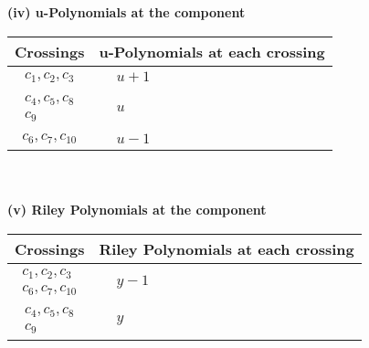 \documentclass[1p]{elsarticle_modified}
\theoremstyle{definition}
\begin{document}
\newpage\renewcommand{\arraystretch}{1}
\flushleft \textbf{(iv) u-Polynomials at the component}\newline \\
\begin{tabular}{m{50pt}|m{274pt}}
Crossings & \hspace{64pt}u-Polynomials at each crossing \\
\hline $$\begin{aligned}c_{1},c_{2},c_{3}\end{aligned}$$&$\begin{aligned}
&u+1
\end{aligned}$\\
\hline $$\begin{aligned}c_{4},c_{5},c_{8}\\c_{9}\end{aligned}$$&$\begin{aligned}
&u
\end{aligned}$\\
\hline $$\begin{aligned}c_{6},c_{7},c_{10}\end{aligned}$$&$\begin{aligned}
&u-1
\end{aligned}$\\
\hline
\end{tabular}\\~\\
\newpage\renewcommand{\arraystretch}{1}
\flushleft \textbf{(v) Riley Polynomials at the component}\newline \\
\begin{tabular}{m{50pt}|m{274pt}}
Crossings & \hspace{64pt}Riley Polynomials at each crossing \\
\hline $$\begin{aligned}c_{1},c_{2},c_{3}\\c_{6},c_{7},c_{10}\end{aligned}$$&$\begin{aligned}
&y-1
\end{aligned}$\\
\hline $$\begin{aligned}c_{4},c_{5},c_{8}\\c_{9}\end{aligned}$$&$\begin{aligned}
&y
\end{aligned}$\\
\hline
\end{tabular}\\~\\
\end{document}
